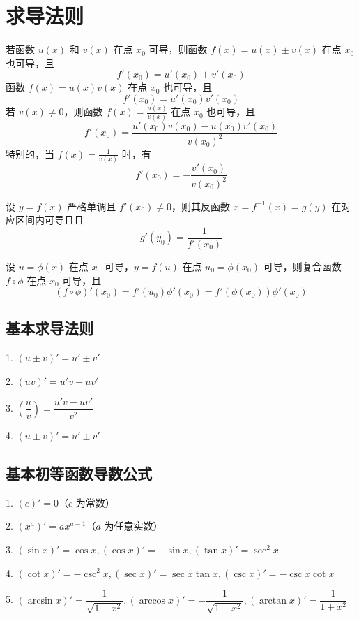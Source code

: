 \section{求导法则}

\begin{theorem}
	若函数 $u(x)$ 和 $v(x)$ 在点 $x_0$ 可导，则函数 $f(x)=u(x)\pm v(x)$ 在点 $x_0$ 也可导，且
	\[ f'(x_0) = u'(x_0)\pm v'(x_0) \]
	函数 $f(x)=u(x)v(x)$ 在点 $x_0$ 也可导，且
	\[ f'(x_0) = u'(x_0)v'(x_0) \]
	若 $v(x)\ne 0$，则函数 $f(x)=\frac{u(x)}{v(x)}$ 在点 $x_0$ 也可导，且
	\[ f'(x_0) = \frac{u'(x_0)v(x_0)-u(x_0)v'(x_0)}{v(x_0)^2} \]
	特别的，当 $f(x) = \frac{1}{v(x)}$ 时，有
	\[ f'(x_0) = -\frac{v'(x_0)}{v(x_0)^2} \]
\end{theorem}

\begin{theorem}
	设 $y=f(x)$ 严格单调且 $f'(x_0) \neq 0$，则其反函数 $x = f^{-1}(x) = g(y)$ 在对应区间内可导且且
	\[ g'(y_0)=\frac{1}{f'(x_0)} \]
\end{theorem}

\begin{theorem}
	设 $u=\phi(x)$ 在点 $x_0$ 可导，$y=f(u)$ 在点 $u_0=\phi(x_0)$ 可导，则复合函数 $f\circ \phi$ 在点 $x_0$ 可导，且
	\[ (f\circ \phi)'(x_0) = f'(u_0)\phi'(x_0) = f'(\phi(x_0))\phi'(x_0) \]
\end{theorem}

\subsection{基本求导法则}

1. $(u\pm v)' = u'\pm v'$

2. $(uv)' = u'v+uv'$

3. $\left(\dfrac{u}{v}\right) = \dfrac{u'v-uv'}{v^2}$

4. $(u\pm v)' = u'\pm v'$

\subsection{基本初等函数导数公式}

1. $(c)' = 0$（$c$ 为常数）

2. $(x^a)' = ax^{a-1}$（$a$ 为任意实数）

3. $(\sin x)' = \cos x,(\cos x)'=-\sin x,(\tan x)'=\sec^2x$

4. $(\cot x)' = -\csc^2 x,(\sec x)'=\sec x \tan x,(\csc x)'=-\csc x \cot x$

5. $(\arcsin x)'=\dfrac{1}{\sqrt{1-x^2}},(\arccos x)' = -\dfrac{1}{\sqrt{1-x^2}},(\arctan x)'=\dfrac{1}{1+x^2}$

